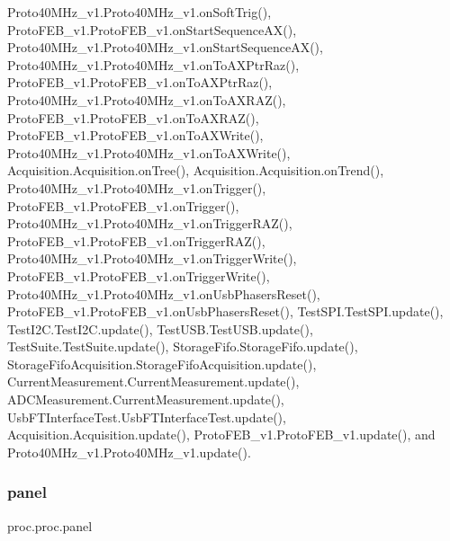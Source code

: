 Proto40\+M\+Hz\+\_\+v1.\+Proto40\+M\+Hz\+\_\+v1.\+on\+Soft\+Trig(), Proto\+F\+E\+B\+\_\+v1.\+Proto\+F\+E\+B\+\_\+v1.\+on\+Start\+Sequence\+A\+X(), Proto40\+M\+Hz\+\_\+v1.\+Proto40\+M\+Hz\+\_\+v1.\+on\+Start\+Sequence\+A\+X(), Proto40\+M\+Hz\+\_\+v1.\+Proto40\+M\+Hz\+\_\+v1.\+on\+To\+A\+X\+Ptr\+Raz(), Proto\+F\+E\+B\+\_\+v1.\+Proto\+F\+E\+B\+\_\+v1.\+on\+To\+A\+X\+Ptr\+Raz(), Proto40\+M\+Hz\+\_\+v1.\+Proto40\+M\+Hz\+\_\+v1.\+on\+To\+A\+X\+R\+A\+Z(), Proto\+F\+E\+B\+\_\+v1.\+Proto\+F\+E\+B\+\_\+v1.\+on\+To\+A\+X\+R\+A\+Z(), Proto\+F\+E\+B\+\_\+v1.\+Proto\+F\+E\+B\+\_\+v1.\+on\+To\+A\+X\+Write(), Proto40\+M\+Hz\+\_\+v1.\+Proto40\+M\+Hz\+\_\+v1.\+on\+To\+A\+X\+Write(), Acquisition.\+Acquisition.\+on\+Tree(), Acquisition.\+Acquisition.\+on\+Trend(), Proto40\+M\+Hz\+\_\+v1.\+Proto40\+M\+Hz\+\_\+v1.\+on\+Trigger(), Proto\+F\+E\+B\+\_\+v1.\+Proto\+F\+E\+B\+\_\+v1.\+on\+Trigger(), Proto40\+M\+Hz\+\_\+v1.\+Proto40\+M\+Hz\+\_\+v1.\+on\+Trigger\+R\+A\+Z(), Proto\+F\+E\+B\+\_\+v1.\+Proto\+F\+E\+B\+\_\+v1.\+on\+Trigger\+R\+A\+Z(), Proto40\+M\+Hz\+\_\+v1.\+Proto40\+M\+Hz\+\_\+v1.\+on\+Trigger\+Write(), Proto\+F\+E\+B\+\_\+v1.\+Proto\+F\+E\+B\+\_\+v1.\+on\+Trigger\+Write(), Proto40\+M\+Hz\+\_\+v1.\+Proto40\+M\+Hz\+\_\+v1.\+on\+Usb\+Phasers\+Reset(), Proto\+F\+E\+B\+\_\+v1.\+Proto\+F\+E\+B\+\_\+v1.\+on\+Usb\+Phasers\+Reset(), Test\+S\+P\+I.\+Test\+S\+P\+I.\+update(), Test\+I2\+C.\+Test\+I2\+C.\+update(), Test\+U\+S\+B.\+Test\+U\+S\+B.\+update(), Test\+Suite.\+Test\+Suite.\+update(), Storage\+Fifo.\+Storage\+Fifo.\+update(), Storage\+Fifo\+Acquisition.\+Storage\+Fifo\+Acquisition.\+update(), Current\+Measurement.\+Current\+Measurement.\+update(), A\+D\+C\+Measurement.\+Current\+Measurement.\+update(), Usb\+F\+T\+Interface\+Test.\+Usb\+F\+T\+Interface\+Test.\+update(), Acquisition.\+Acquisition.\+update(), Proto\+F\+E\+B\+\_\+v1.\+Proto\+F\+E\+B\+\_\+v1.\+update(), and Proto40\+M\+Hz\+\_\+v1.\+Proto40\+M\+Hz\+\_\+v1.\+update().

\mbox{\label{classproc_1_1proc_a36068ce6d978f4f4dde164e7bdc2e057}} 
\subsubsection{\texorpdfstring{panel}{panel}}
{\footnotesize\ttfamily proc.\+proc.\+panel\hspace{0.3cm}{\ttfamily [inherited]}}



